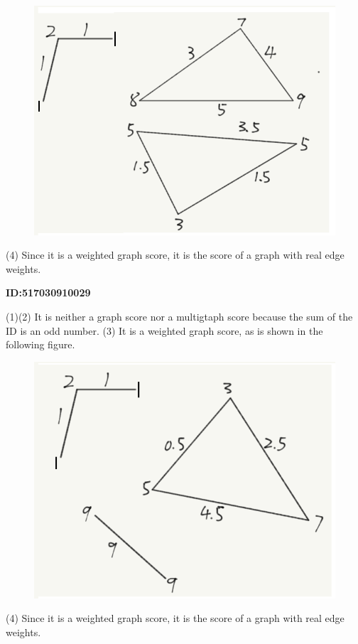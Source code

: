 \documentclass{article} %
\begin{document}
	\begin{figure}[H]
		\centering
		\includegraphics[scale=0.6]{10258.png}
		\caption{}
		\label{fig:2}
	\end{figure}
	(4) Since it is a weighted graph score, it is the score of a graph with real edge weights.

	\textbf{ID:517030910029}\par
	(1)(2) It is neither a graph score nor a multigtaph score because the sum of the ID is an odd number.
	(3) It is a weighted graph score, as is shown in the following figure.
	
	\begin{figure}[H]
		\centering
		\includegraphics[scale=0.6]{10029.png}
		\caption{}
		\label{fig:3}
	\end{figure}
	(4) Since it is a weighted graph score, it is the score of a graph with real edge weights.
\end{document}
